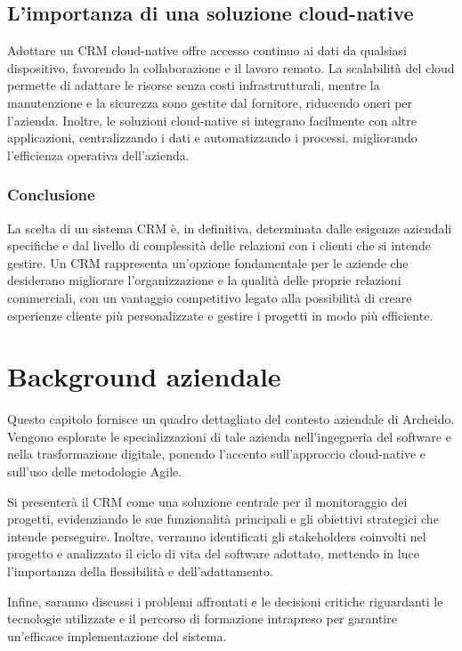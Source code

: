 \documentclass[target=bach,aauheader=,style=]{thud}
\begin{document}
\section{L'importanza di una soluzione cloud-native}
Adottare un CRM cloud-native offre accesso continuo ai dati da qualsiasi dispositivo, favorendo la collaborazione e il lavoro remoto. La scalabilità del cloud permette di adattare le risorse senza costi infrastrutturali, mentre la manutenzione e la sicurezza sono gestite dal fornitore, riducendo oneri per l'azienda. Inoltre, le soluzioni cloud-native si integrano facilmente con altre applicazioni, centralizzando i dati e automatizzando i processi, migliorando l'efficienza operativa dell'azienda.

\subsection{Conclusione}
La scelta di un sistema CRM è, in definitiva, determinata dalle esigenze aziendali specifiche e dal livello di complessità delle relazioni con i clienti che si intende gestire. Un CRM rappresenta un'opzione fondamentale per le aziende che desiderano migliorare l'organizzazione e la qualità delle proprie relazioni commerciali, con un vantaggio competitivo legato alla possibilità di creare esperienze cliente più personalizzate e gestire i progetti in modo più efficiente.

\chapter{Background aziendale}
Questo capitolo fornisce un quadro dettagliato del contesto aziendale di Archeido. Vengono esplorate le specializzazioni di tale azienda nell'ingegneria del software e nella trasformazione digitale, ponendo l'accento sull'approccio cloud-native e sull'uso delle metodologie Agile.

\noindent Si presenterà il CRM come una soluzione centrale per il monitoraggio dei progetti, evidenziando le sue funzionalità principali e gli obiettivi strategici che intende perseguire. Inoltre, verranno identificati gli stakeholders coinvolti nel progetto e analizzato il ciclo di vita del software adottato, mettendo in luce l'importanza della flessibilità e dell'adattamento. 

\noindent Infine, saranno discussi i problemi affrontati e le decisioni critiche riguardanti le tecnologie utilizzate e il percorso di formazione intrapreso per garantire un'efficace implementazione del sistema.
\end{document}
